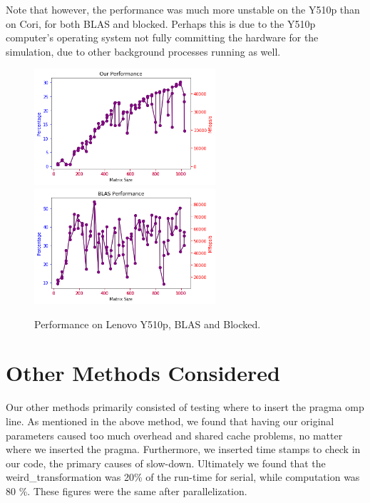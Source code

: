 \documentclass[12pt]{article}
\begin{document}
Note that however, the performance was much more unstable on the Y510p than on Cori, for both BLAS and blocked. Perhaps this is due to the Y510p computer's operating system not fully committing the hardware for the simulation, due to other background processes running as well. 

\begin{figure}[h]
  \caption{Performance on Lenovo Y510p, BLAS and Blocked.}
  \centering
  \includegraphics[width=0.6\textwidth]{blocked_local.png}
    \includegraphics[width=0.6\textwidth]{blas_local.png}
\end{figure}

\newpage 
\section{Other Methods Considered}
Our other methods primarily consisted of testing where to insert the pragma omp line. As mentioned in the above method, we found that having our original parameters caused too much overhead and shared cache problems, no matter where we inserted the pragma. Furthermore, we inserted time stamps to check in our code, the primary causes of slow-down. Ultimately we found that the weird\_transformation was 20\% of the run-time for serial, while computation was 80 \%. These figures were the same after parallelization. 

 
\end{document}

